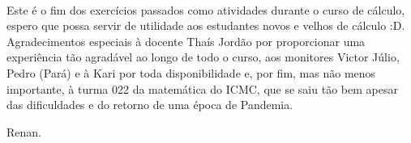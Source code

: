 \documentclass{article}
\begin{document}
\paragraph{} Este é o fim dos exercícios passados como atividades durante o curso de cálculo, espero que
possa servir de utilidade aos estudantes novos e velhos de cálculo :D. Agradecimentos especiais à docente
Thaís Jordão por proporcionar uma experiência tão agradável ao longo de todo o curso, aos monitores
Victor Júlio, Pedro (Pará) e à Kari por toda disponibilidade e, por fim, mas não menos importante, à
turma 022 da matemática do ICMC, que se saiu tão bem apesar das dificuldades e do retorno de uma época de Pandemia.

Renan.
\end{document}
